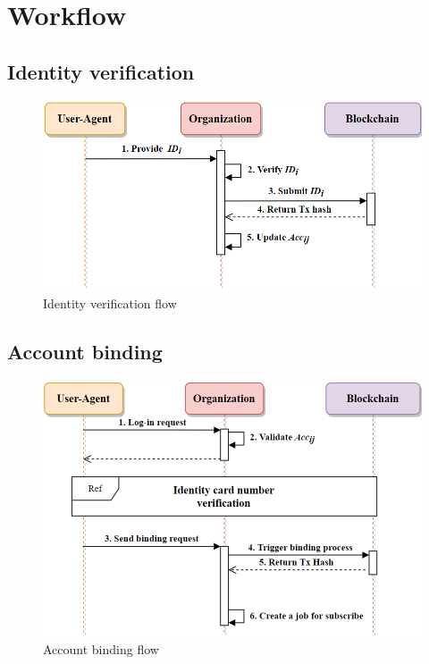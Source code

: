 \section{Workflow} \label{ssec:workflow}
    \subsection{Identity verification}
    \begin{figure}[htb]
        \centering
        \includegraphics[height=!,width=0.8\linewidth,keepaspectratio=true]{figures/identity_verification.png}
        \caption{{\footnotesize Identity verification flow}}
        \label{fig:identityVerification}
    \end{figure}


    \newpage
    \subsection{Account binding}
    \begin{figure}[htb]
        \centering
        \includegraphics[height=!,width=0.8\linewidth,keepaspectratio=true]{figures/account_binding.png}
        \caption{{\footnotesize Account binding flow}}
        \label{fig:accountBinding}
    \end{figure}

